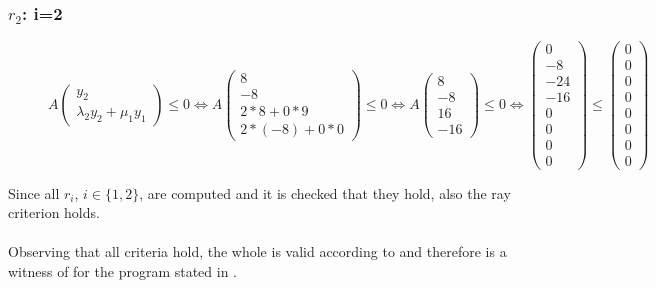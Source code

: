 	\subsubsection{$r_2$: i=2}
	\begin{figure}[H]
		\centering
		$A\begin{pmatrix} y_2 \\ \lambda_2y_2+\mu_1y_1 \end{pmatrix} \le 0 \Leftrightarrow A\begin{pmatrix} 8 \\ -8 \\ 2*8+0*9 \\ 2*(-8)+0*0 \end{pmatrix} \le 0 \Leftrightarrow A\begin{pmatrix} 8 \\ -8 \\ 16 \\ -16 \end{pmatrix} \le 0 \Leftrightarrow \begin{pmatrix} 0 \\ -8 \\ -24 \\ -16 \\ 0 \\ 0 \\ 0 \\ 0 \end{pmatrix} \le \begin{pmatrix} 0 \\ 0 \\ 0 \\ 0 \\ 0 \\ 0 \\ 0 \\ 0 \end{pmatrix}$
	\end{figure}

	Since all $r_i$, $i \in \{1,2\}$, are computed and it is checked that they hold, also the ray criterion holds.
	\\
	\\
	Observing that all criteria hold, the whole \gna is valid according to  and therefore is a witness of \nonterm for the program stated in .
	
